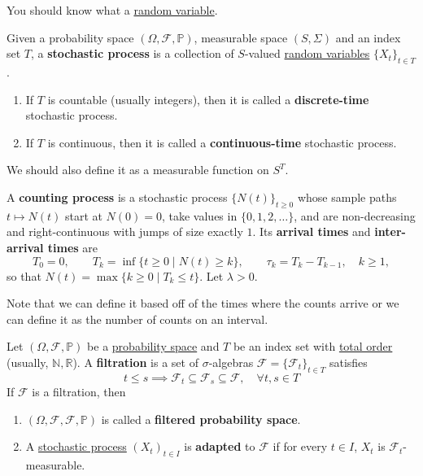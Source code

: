 
You should know what a \hyperref[prob-def:random-variable]{random variable}. 

\begin{definition}
	\label{def:stochastic-process}
	Given a probability space $(\Omega, \mathcal{F}, \mathbb{P})$, measurable space $(S, \Sigma)$ and an index set $T$, a \textbf{stochastic process} is a collection of $S$-valued \hyperref[prob-def:random-variable]{random variables} $\{X_t\}_{t \in T}$. 
	\begin{enumerate}
		\item If $T$ is countable (usually integers), then it is called a \textbf{discrete-time} stochastic process. 
		\item If $T$ is continuous, then it is called a \textbf{continuous-time} stochastic process. 
	\end{enumerate}
\end{definition}

We should also define it as a measurable function on $S^T$. 

\begin{definition} 
	\label{def:counting-process}
	A \textbf{counting process} is a stochastic process $\{N(t)\}_{t \geq 0}$ whose sample paths $t \mapsto N(t)$ start at $N(0) = 0$, take values in $\{0, 1, 2, \ldots\}$, and are non-decreasing and right-continuous with jumps of size exactly $1$. Its \textbf{arrival times} and \textbf{inter-arrival times} are
		\begin{equation}
			T_0 = 0, \qquad T_k = \inf\{t \geq 0 \mid N(t) \geq k\}, \qquad \tau_k = T_k - T_{k-1}, \quad k \geq 1,
		\end{equation}
	so that $N(t) = \max\{k \geq 0 \mid T_k \leq t\}$. Let $\lambda > 0$. 
\end{definition}

Note that we can define it based off of the times where the counts arrive or we can define it as the number of counts on an interval. 

\begin{definition}[Filtration]
	\label{def:filtration}
	Let $(\Omega, \mathcal{F}, \mathbb{P})$ be a \hyperref[prob-def:probability-space]{probability space} and $T$ be an index set with \hyperref[st-def:total-order]{total order} (usually, $\mathbb{N}, \mathbb{R}$). A \textbf{filtration} is a set of $\sigma$-algebras $\mathscr{F} = \{\mathcal{F}_t\}_{t \in T}$ satisfies
	\begin{equation}
		t \leq s \implies \mathcal{F}_t \subseteq \mathcal{F}_s \subseteq \mathcal{F}, \quad \forall t, s \in T
	\end{equation}
	If $\mathscr{F}$ is a filtration, then 
	\begin{enumerate}
		\item $(\Omega, \mathcal{F}, \mathscr{F}, \mathbb{P})$ is called a \textbf{filtered probability space}. 
		\item A \hyperref[def:stochastic-process]{stochastic process} $(X_t)_{t \in I}$ is \textbf{adapted} to $\mathscr{F}$ if for every $t \in I$, $X_t$ is $\mathcal{F}_t$-measurable. 
	\end{enumerate}
\end{definition}

